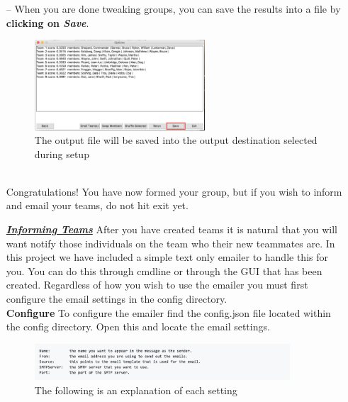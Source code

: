 \documentclass[10pt]{article}
\begin{document}
\begin{enumerate}
\begin{figure}[h]
\end{figure}\\
\item[--] When you are done tweaking groups, you can save the results into a file by \textbf{clicking on \textit{Save}}. 
\begin{figure}[h]
\caption{The output file will be saved into the output destination selected during setup}
\centering
\includegraphics[width=0.6\textwidth]{pic20}
\end{figure}\\
Congratulations! You have now formed your group, but if you wish to inform and email your teams, do not hit exit yet. 
\newpage
\maketitle
\LARGE
\textbf{\textit{\underline{Informing Teams}}}
\normalsize
\newline
\newline
After you have created teams it is natural that you will want notify those individuals on the team who their new teammates are. In this project we have included a simple text only emailer to handle this for you. You can do this through cmdline or through the GUI that has been created. Regardless of how you wish to use the emailer you must first configure the email settings in the config directory.\\
\newline
\large
\textbf{Configure}
\normalsize
\newline
To configure the emailer find the config.json file located within the config directory. Open this and locate the email settings. 
\begin{figure}[h]
\caption{The following is an explanation of each setting}
\centering
\includegraphics[width=0.9\textwidth]{pic21}
\end{figure}\\

\end{enumerate}
\end{document}
